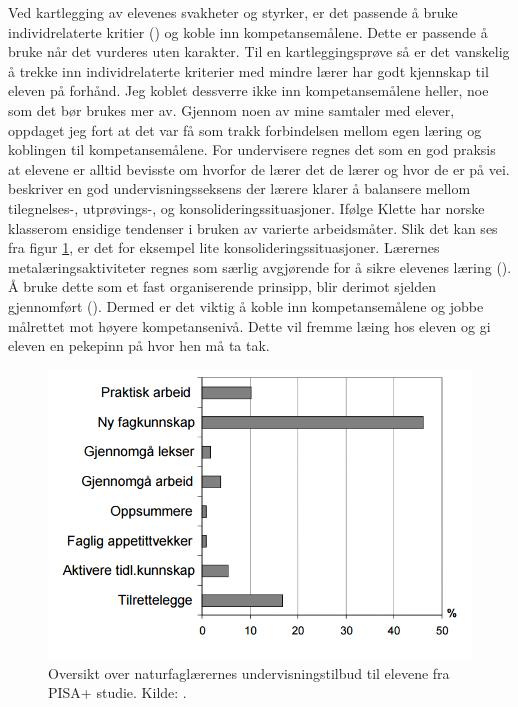 \documentclass[main.tex]{subfiles}
\begin{document}
Ved kartlegging av elevenes svakheter og styrker, er det passende å bruke individrelaterte kritier 
() og koble inn kompetansemålene. Dette er passende å bruke når det vurderes uten karakter. 
Til en kartleggingsprøve så er det 
vanskelig å trekke inn individrelaterte kriterier med mindre lærer har godt kjennskap til eleven på forhånd. Jeg 
koblet dessverre ikke inn kompetansemålene heller, noe som det bør brukes mer av. Gjennom noen av mine samtaler 
med elever, oppdaget jeg fort at det var få som trakk forbindelsen mellom egen læring og koblingen til kompetansemålene. 
For undervisere regnes det som en god praksis at elevene er alltid bevisste om hvorfor de lærer det de lærer og hvor 
de er på vei.  beskriver en god undervisningsseksens der lærere klarer å balansere mellom 
tilegnelses-, utprøvings-, og konsolideringssituasjoner. Ifølge Klette har norske klasserom ensidige tendenser i bruken 
av varierte arbeidsmåter. Slik det kan ses fra figur \ref{fig:odeg10}, er det for eksempel lite 
konsolideringssituasjoner. Lærernes metalæringsaktiviteter regnes som særlig avgjørende for å sikre elevenes læring 
(). Å bruke dette som et fast organiserende prinsipp, blir derimot sjelden gjennomført 
(). Dermed er det viktig å koble inn kompetansemålene og jobbe målrettet mot høyere
kompetansenivå. Dette vil fremme læing hos eleven og gi eleven en pekepinn på hvor hen må ta tak.
\begin{figure}[h!]
\includegraphics[scale = 0.6]{../figures/undervisnings_aktivitet.png}
\caption{Oversikt over naturfaglærernes undervisningstilbud til elevene fra PISA+ studie. Kilde: 
\protect{}.}
\label{fig:odeg10}
\end{figure}
\end{document}
